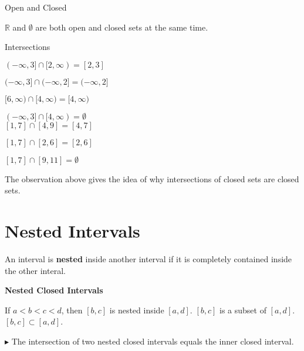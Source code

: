 \documentclass{ximera}
\begin{document}
\begin{fact} Open and Closed

$\mathbb{R}$ and $\emptyset$ are both open and closed sets at the same time.


\end{fact}






\begin{observation} Intersections

$(-\infty, 3] \cap  [2, \infty) = [2, 3]$

$(-\infty, 3] \cap  (-\infty, 2] = (-\infty, 2]$

$[6, \infty)  \cap  [4, \infty) = [4, \infty)$

$(-\infty, 3] \cap  [4, \infty) = \emptyset$ \\






$[1, 7] \cap  [4, 9] = [4, 7]$

$[1, 7] \cap  [2, 6] = [2, 6]$

$[1, 7] \cap  [9, 11] = \emptyset$


\end{observation}


The observation above gives the idea of why intersections of closed sets are closed sets.
















\section{Nested Intervals}


An interval is \textbf{nested} inside another interval if it is completely contained inside the other interal.





\textbf{Nested Closed Intervals}

If $a < b < c < d$, then $[b,c]$ is nested inside $[a,d]$.   $[b,c]$ is a subset of $[a,d]$.  $[b,c] \subset [a,d]$.



$\blacktriangleright$  The intersection of two nested closed intervals equals the inner closed interval.
\end{document}
